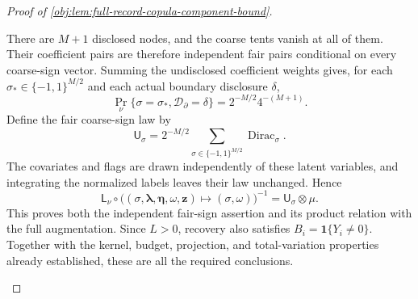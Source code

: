 \documentclass[11pt]{article}
\begin{document}
\begin{proof}[Proof of \cref{obj:lem:full-record-copula-component-bound}]
\begin{enumerate}
There are \(M+1\) disclosed nodes, and the coarse tents vanish at all of them. Their coefficient pairs are therefore independent fair pairs conditional on every coarse-sign vector. Summing the undisclosed coefficient weights gives, for each
\(\sigma_*\in\{-1,1\}^{M/2}\) and each actual boundary disclosure \(\delta\),
\[
\Pr_\nu\{\sigma=\sigma_*,\mathcal D_{\partial}=\delta\}
 =2^{-M/2}4^{-(M+1)}.
\]
Define the fair coarse-sign law by
\[
\mathsf U_\sigma
 =2^{-M/2}\sum_{\sigma\in\{-1,1\}^{M/2}}
       \operatorname{Dirac}_{\sigma}.
\]
The covariates and flags are drawn independently of these latent variables, and integrating the normalized labels leaves their law unchanged. Hence
\[
\mathsf L_\nu\circ
 \bigl((\sigma,\boldsymbol\lambda,\boldsymbol\eta,\omega,\mathbf z)
       \mapsto(\sigma,\omega)\bigr)^{-1}
 =\mathsf U_\sigma\otimes\mu.
\]
This proves both the independent fair-sign assertion and its product relation with the full augmentation. Since \(L>0\), recovery also satisfies
\(B_i=\mathbf1\{Y_i\ne0\}\). Together with the kernel, budget, projection, and total-variation properties already established, these are all the required conclusions.
\end{enumerate}
\end{proof}
\end{document}
